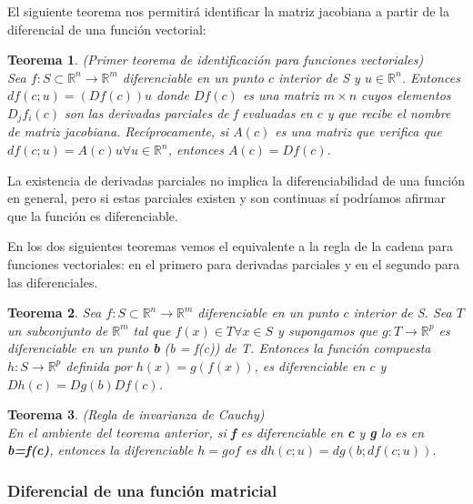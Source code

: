 \documentclass{article}
\theoremstyle{theorem-style}  %
\newtheorem{theorem}{Teorema}[section]  %
\theoremstyle{definition-style}
\theoremstyle{example-style}
\theoremstyle{exercise-style}
\begin{document}
	El siguiente teorema nos permitirá identificar la matriz jacobiana a partir de la diferencial de una función vectorial:
	
	\begin{theorem} (Primer teorema de identificación para funciones vectoriales)\\
		Sea $f: S\subset \mathbb{R}^n \rightarrow \mathbb{R}^m$ diferenciable en un punto $c$ interior de S y $u  \in \mathbb{R}^n$. Entonces $df(c;u)=(Df(c))u$ donde $Df(c)$ es una matriz $m \times n$ cuyos elementos $D_jf_i(c)$ son las derivadas parciales de f evaluadas en $c$ y que recibe el nombre de matriz jacobiana. Recíprocamente, si $A(c)$ es una matriz que verifica que $df(c;u)=A(c)u \forall u\in \mathbb{R}^n$, entonces $A(c) = Df(c)$. 
	\end{theorem}
	
	La existencia de derivadas parciales no implica la diferenciabilidad de una función en general, pero si estas parciales existen y son continuas sí podríamos afirmar que la función es diferenciable.
	
	En los dos siguientes teoremas vemos el equivalente a la regla de la cadena para funciones vectoriales: en el primero para derivadas parciales y en el segundo para las diferenciales.
	
	\begin{theorem}
		Sea $f: S\subset \mathbb{R}^n \rightarrow \mathbb{R}^m$ diferenciable en un punto $c$ interior de S. Sea $T$ un subconjunto de $\mathbb{R}^m$ tal que $f(x) \in T \forall x \in S$ y supongamos que $g: T \rightarrow \mathbb{R}^p$ es diferenciable en un punto \textbf{b} (b = f(c)) de T. Entonces la función compuesta $h: S \rightarrow \mathbb{R}^p$ definida por $h(x)=g(f(x))$, es diferenciable en $c$ y $Dh(c)=Dg(b)Df(c)$.
	\end{theorem}
	
	\begin{theorem} (Regla de invarianza de Cauchy) \\
		En el ambiente del teorema anterior, si \textbf{f} es diferenciable en \textbf{c} y \textbf{g} lo es en \textbf{b=f(c)}, entonces la diferenciable $h=g$o$f$ es $dh(c;u) = dg(b;df(c;u))$.   
		
	\end{theorem}
	
	\subsubsection{Diferencial de una función matricial}
	
\end{document}
